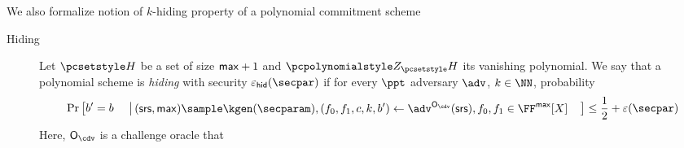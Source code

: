 \documentclass[runningheads,11pt]{llncs}
\let\spvec\vec
\let\vec\accentvec
\let\spvec\vec
\let\vec\spvec
\def\vec#1{\mathchoice{\mbox{\boldmath$\displaystyle#1$}}
  {\mbox{\boldmath$\textstyle#1$}} {\mbox{\boldmath$\scriptstyle#1$}}
  {\mbox{\boldmath$\scriptscriptstyle#1$}}}
\begin{document}
We also formalize notion of $k$-hiding property of a polynomial commitment scheme
\begin{description}
\item[Hiding] Let $\HHH$ be a set of size $\mathsf{max} + 1$ and $\ZERO_\HHH$ its
  vanishing polynomial. We say that a polynomial scheme is \emph{hiding} with
  security $\epsh(\secpar)$ if for every $\ppt$ adversary $\adv$, $k \in \NN$,
  probability
  \begin{align*}
    \Pr\left[
    \begin{aligned}
      & b' = b
      \end{aligned}
        \,\left|\,
        \begin{aligned}
    & (\srs, \maxdeg) \sample \kgen(\secparam),
    (f_0, f_1, c, k, b') \gets \adv^{\oraclec}(\srs), f_0, f_1 \in \FF^{\maxdeg}
    [X]
    \end{aligned}
    \right.\right] \leq \frac{1}{2} + \eps(\secpar)
  \end{align*}
  Here, $\oraclec$ is a challenge oracle that
  \end{description}
\end{document}
